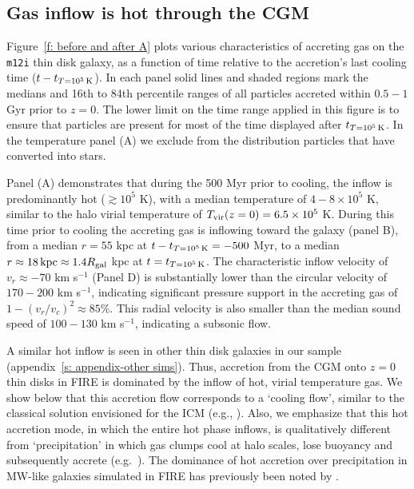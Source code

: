 \documentclass[fleqn,usenatbib]{mnras}
\newcommand{\tcon}{t_{T=10^5\,{\rm K}}}
\newcommand{\Tvir}{T_{\rm vir}}
\begin{document}
\subsection{Gas inflow is hot through the CGM}
\label{s: characteristics -- inflowing gas phase}

Figure~\ref{f: before and after A} plots various characteristics of accreting gas on the \texttt{m12i} thin disk galaxy, as a function of time relative to the accretion's last cooling time ($t - \tcon$).
In each panel solid lines and shaded regions mark the medians and 16th to 84th percentile ranges of all particles accreted within $0.5-1$ Gyr prior to $z=0$.
The lower limit on the time range applied in this figure is to ensure that particles are present for most of the time displayed after $\tcon$.
In the temperature panel (A) we exclude from the distribution particles that have converted into stars. 

Panel (A) demonstrates that during the 500 Myr prior to cooling, the inflow is predominantly hot ($\gtrsim 10^5$ K), with a median temperature of $4-8\times10^5$ K, similar to the halo virial temperature of $\Tvir(z=0)=6.5\times10^5$ K.
During this time prior to cooling the accreting gas is inflowing toward the galaxy (panel B), from a median $r=55$ kpc at $t-\tcon=-500$ Myr, to a median $r\approx18\,{\rm kpc}\approx1.4 R_{\rm gal}$ kpc at $t=\tcon$.
The characteristic inflow velocity of $v_r \approx-70$ km s$^{-1}$ (Panel D) is substantially lower than the circular velocity of $170-200$ km s$^{-1}$, indicating significant pressure support in the accreting gas of $1-(v_r/v_c)^2\approx85\%$. This radial velocity is also smaller than the median sound speed of $100-130$ km s$^{-1}$, indicating a subsonic flow. 


A similar hot inflow is seen in other thin disk galaxies in our sample (appendix~\ref{s: appendix-other sims}).
Thus, accretion from the CGM onto $z=0$ thin disks in FIRE is dominated by the inflow of hot, virial temperature gas.
We show below that this accretion flow corresponds to a `cooling flow', similar to the classical solution envisioned for the ICM (e.g., \citealt{Mathews1978}).
Also, we emphasize that this hot accretion mode, in which the entire hot phase inflows, is qualitatively different from `precipitation' in which gas clumps cool at halo scales, lose buoyancy and subsequently accrete (e.g.~\citealt{Maller2004,Voit2017}). The dominance of hot accretion over precipitation in MW-like galaxies simulated in FIRE has previously been noted by \cite{Esmerian2020}. 
\end{document}
